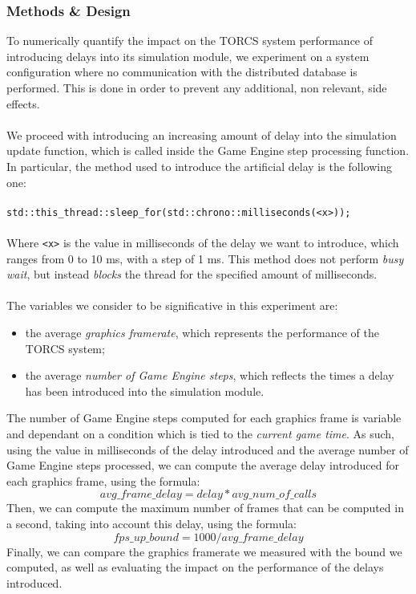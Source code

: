 \subsubsection{Methods \& Design}\label{delay-design}
To numerically quantify the impact on the TORCS system performance of introducing delays into its simulation module, we experiment on a system configuration where no communication with the distributed database is performed. This is done in order to prevent any additional, non relevant, side effects. \\ \\
We proceed with introducing an increasing amount of delay into the simulation update function, which is called inside the Game Engine step processing function. In particular, the method used to introduce the artificial delay is the following one: \\ \\
\texttt{std::this\_thread::sleep\_for(std::chrono::milliseconds(<x>));}
\\ \\
Where \texttt{<x>} is the value in milliseconds of the delay we want to introduce, which ranges from 0 to 10 ms, with a step of 1 ms. This method does not perform \textit{busy wait}, but instead \textit{blocks} the thread for the specified amount of milliseconds. \\ \\
The variables we consider to be significative in this experiment are:
\begin{itemize}
	\item the average \textit{graphics framerate}, which represents the performance of the TORCS system;
	\item the average \textit{number of Game Engine steps}, which reflects the times a delay has been introduced into the simulation module. 
\end{itemize}
The number of Game Engine steps computed for each graphics frame is variable and dependant on a condition which is tied to the \textit{current game time}. As such, using the value in milliseconds of the delay introduced and the average number of Game Engine steps processed, we can compute the average delay introduced for each graphics frame, using the formula:
\[avg\_frame\_delay = delay * avg\_num\_of\_calls\]
Then, we can compute the maximum number of frames that can be computed in a second, taking into account this delay, using the formula:
\[fps\_up\_bound = 1000 / avg\_frame\_delay\]
Finally, we can compare the graphics framerate we measured with the bound we computed, as well as evaluating the impact on the performance of the delays introduced.

